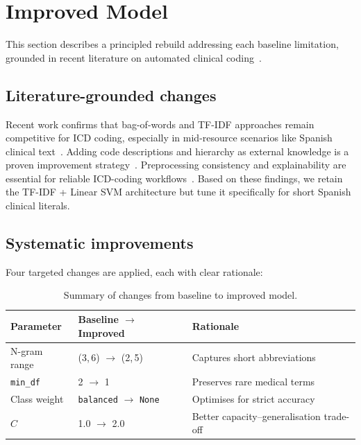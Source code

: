 \documentclass{article}
\begin{document}
\section{Improved Model}
\label{sec:improved}

This section describes a principled rebuild addressing each baseline limitation, grounded in recent literature on automated clinical coding~\cite{Dong2022, Blanco2020, Canela2024}.

\subsection{Literature-grounded changes}
\label{ssec:lit_changes}

Recent work confirms that bag-of-words and TF-IDF approaches remain competitive for ICD coding, especially in mid-resource scenarios like Spanish clinical text~\cite{Blanco2020}. Adding code descriptions and hierarchy as external knowledge is a proven improvement strategy~\cite{Dong2022}. Preprocessing consistency and explainability are essential for reliable ICD-coding workflows~\cite{Canela2024}. Based on these findings, we retain the TF-IDF + Linear SVM architecture but tune it specifically for short Spanish clinical literals.

\subsection{Systematic improvements}
\label{ssec:changes}

Four targeted changes are applied, each with clear rationale:

\begin{table}[htb]
\centering
\caption{Summary of changes from baseline to improved model.}
\label{tab:changes}
\begin{tabular}{p{1.5cm}p{2.9cm}p{2.6cm}}
\toprule
\textbf{Parameter} & \textbf{Baseline $\to$ Improved} & \textbf{Rationale} \\
\midrule
N-gram range & (3,\,6) $\to$ (2,\,5) & Captures short abbreviations \\
\texttt{min\_df} & 2 $\to$ 1 & Preserves rare medical terms \\
Class weight & \texttt{balanced} $\to$ \texttt{None} & Optimises for strict accuracy \\
$C$ & 1.0 $\to$ 2.0 & Better capacity--generalisation trade-off \\
\bottomrule
\end{tabular}
\end{table}
\end{document}
